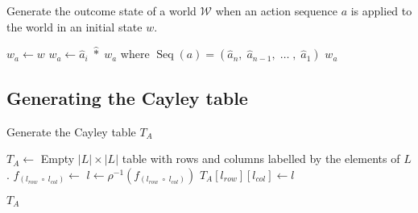 \begin{algorithm}[H]
	\caption{
		Generate the outcome state of a world $\mathscr{W}$ when an action sequence $a$ is applied to the world in an initial state $w$.
	}
	\label{alg:GenerateActionOutcome}
	\hrulefill
	\begin{algorithmic}[1]
		\State $w_{a} \gets w$
		\State $w_{a} \gets \hat{a}_{i} \; \hat{\ast} \; w_{a}$ where $\operatorname{Seq}(a) = (\hat{a}_n, \; \hat{a}_{n-1}, \; \dots \;, \; \hat{a}_1)$
		\EndFor
		\State \Return $w_{a}$
		\EndProcedure
	\end{algorithmic}
\end{algorithm}


\subsection{Generating the Cayley table}

\begin{algorithm}[H]
	\caption{
		Generate the Cayley table $T_{A}$
	}
        \label{alg:GenerateCayley}
	\hrulefill
	\begin{algorithmic}[1]
		\State $T_{A} \gets$ Empty $|L| \times |L|$ table with rows and columns labelled by the elements of $L$.
		\Statex {}
		\Statex {}
		\State $f_{(l_{row} \; \circ \; l_{col})} \gets$ 
		\State $l \gets \rho^{-1}(f_{(l_{row} \; \circ \; l_{col})})$
		\State $T_{A}[l_{row}][l_{col}] \gets l$


		\EndFor
		\EndFor

		\State \Return $T_{A}$
		\EndProcedure
	\end{algorithmic}
\end{algorithm}


